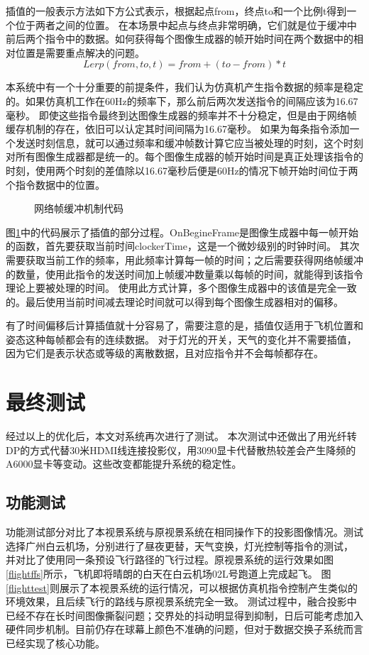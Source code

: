 \par
插值的一般表示方法如下方公式表示，根据起点from，终点to和一个比例t得到一个位于两者之间的位置。
在本场景中起点与终点非常明确，它们就是位于缓冲中前后两个指令中的数据。如何获得每个图像生成器的帧开始时间在两个数据中的相对位置是需要重点解决的问题。
$$Lerp(from,to,t)=from+(to-from)*t$$
\par
本系统中有一个十分重要的前提条件，我们认为仿真机产生指令数据的频率是稳定的。如果仿真机工作在60Hz的频率下，那么前后两次发送指令的间隔应该为16.67毫秒。
即使这些指令最终到达图像生成器的频率并不十分稳定，但是由于网络帧缓存机制的存在，依旧可以认定其时间间隔为16.67毫秒。
如果为每条指令添加一个发送时刻信息，就可以通过频率和缓冲帧数计算它应当被处理的时刻，这个时刻对所有图像生成器都是统一的。每个图像生成器的帧开始时间是真正处理该指令的时刻，使用两个时刻的差值除以16.67毫秒后便是60Hz的情况下帧开始时间位于两个指令数据中的位置。
\begin{figure}[h!]
    \centering
     
    \caption{网络帧缓冲机制代码}
    \label{lerpcode}
\end{figure}
\par
图\ref{lerpcode}中的代码展示了插值的部分过程。OnBegineFrame是图像生成器中每一帧开始的函数，首先要获取当前时间clockerTime，这是一个微妙级别的时钟时间。
其次需要获取当前工作的频率，用此频率计算每一帧的时间；之后需要获得网络帧缓冲的数量，使用此指令的发送时间加上帧缓冲数量乘以每帧的时间，就能得到该指令理论上要被处理的时间。
使用此方式计算，多个图像生成器中的该值是完全一致的。最后使用当前时间减去理论时间就可以得到每个图像生成器相对的偏移。
\par
有了时间偏移后计算插值就十分容易了，需要注意的是，插值仅适用于飞机位置和姿态这种每帧都会有的连续数据。
对于灯光的开关，天气的变化并不需要插值，因为它们是表示状态或等级的离散数据，且对应指令并不会每帧都存在。

\section{最终测试}
经过以上的优化后，本文对系统再次进行了测试。
本次测试中还做出了用光纤转DP的方式代替30米HDMI线连接投影仪，用3090显卡代替散热较差会产生降频的A6000显卡等变动。这些改变都能提升系统的稳定性。
\subsection{功能测试}
功能测试部分对比了本视景系统与原视景系统在相同操作下的投影图像情况。测试选择广州白云机场，分别进行了昼夜更替，天气变换，灯光控制等指令的测试，
并对比了使用同一条预设飞行路径的飞行过程。原视景系统的运行效果如图\ref{flightffs}所示，飞机即将晴朗的白天在白云机场02L号跑道上完成起飞。
图\ref{flighttest}则展示了本视景系统的运行情况，可以根据仿真机指令控制产生类似的环境效果，且后续飞行的路线与原视景系统完全一致。
测试过程中，融合投影中已经不存在长时间图像撕裂问题；交界处的抖动明显得到抑制，日后可能考虑加入硬件同步机制。目前仍存在球幕上颜色不准确的问题，但对于数据交换子系统而言已经实现了核心功能。

